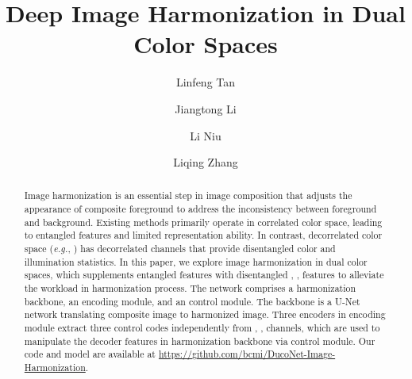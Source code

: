 \documentclass[sigconf]{acmart}
\begin{document}
\title{Deep Image Harmonization in Dual Color Spaces}

\author{Linfeng Tan}

\author{Jiangtong Li}

\author{Li Niu}

\author{Liqing Zhang}
\authornotemark[1]

\begin{abstract}

Image harmonization is an essential step in image composition that adjusts the appearance of composite foreground to address the inconsistency between foreground and background. 
Existing methods primarily operate in correlated  color space, leading to entangled features and limited representation ability. 
In contrast, decorrelated color space (\emph{e.g.}, ) has decorrelated channels that provide disentangled color and illumination statistics. 
In this paper, we explore image harmonization in dual color spaces, which supplements entangled  features with disentangled , ,  features to alleviate the workload in harmonization process. 
The network comprises a  harmonization backbone, an  encoding module, and an  control module. 
The backbone is a U-Net network translating composite image to harmonized image. Three encoders in  encoding module extract three control codes independently from , ,  channels, which are used to manipulate the decoder features in harmonization backbone via  control module. 
Our code and model are available at \href{https://github.com/bcmi/DucoNet-Image-Harmonization}{https://github.com/bcmi/DucoNet-Image-Harmonization}.

\end{abstract}
\end{document}
